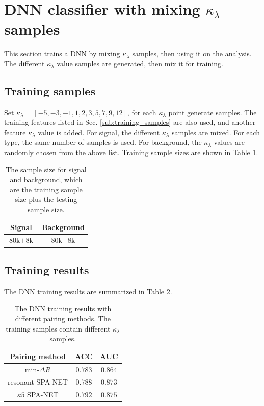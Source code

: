 \documentclass[12pt]{article}
\begin{document}
	
\section{DNN classifier with mixing \texorpdfstring{$\kappa_\lambda$}{kappa} samples}%
\label{sec:dnn_classifier_with_mixing_kappa_samples}
	This section trains a DNN by mixing $\kappa_\lambda$ samples, then using it on the analysis. The different $\kappa_\lambda$ value samples are generated, then mix it for training.
	\subsection{Training samples}%
	\label{sub:training_samples2}
	Set $\kappa_\lambda = [-5, -3, -1, 1, 2, 3, 5, 7, 9, 12]$, for each $\kappa_\lambda$ point generate samples. The training features listed in Sec. \ref{sub:training_samples} are also used, and another feature $\kappa_\lambda$ value is added. For signal, the different $\kappa_\lambda$ samples are mixed. For each type, the same number of samples is used. For background, the $\kappa_\lambda$ values are randomly chosen from the above list. Training sample sizes are shown in Table \ref{tab:DNN_sample_size3}.
		\begin{table}[htpb]
			\centering
			\caption{The sample size for signal and background, which are the training sample size plus the testing sample size.}
			\label{tab:DNN_sample_size3}
			\begin{tabular}{c|c}
			 Signal & Background\\ \hline
			 $\text{80k} + \text{8k}$      &$\text{80k} + \text{8k}$ 
			\end{tabular}
		\end{table}

	\subsection{Training results}%
	\label{sub:training_results}
		The DNN training results are summarized in Table \ref{tab:DNN_results3}.
		\begin{table}[htpb]
			\centering
			\caption{The DNN training results with different pairing methods. The training samples contain different $\kappa_\lambda$ samples.}
			\label{tab:DNN_results3}
			\begin{tabular}{c|cc}
			Pairing method        & ACC     & AUC   \\ \hline
			$\text{min-}\Delta R$ & $0.783$ & $0.864$ \\
			resonant SPA-NET      & $0.788$ & $0.873$ \\
			$\kappa 5$ SPA-NET    & $0.792$ & $0.875$
			\end{tabular}      
		\end{table}
	
\end{document}
